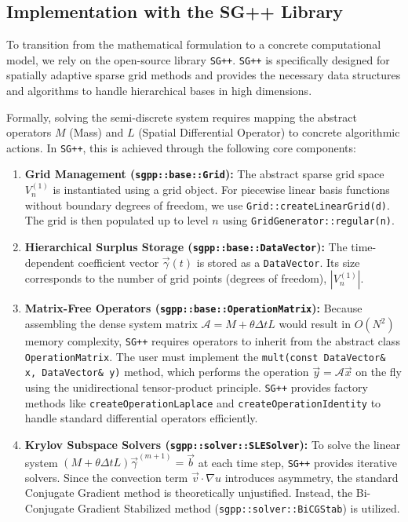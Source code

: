 \documentclass[12pt, a4paper]{article}
\begin{document}
\subsection{Implementation with the SG++ Library}

To transition from the mathematical formulation to a concrete computational model, we rely on the open-source library \texttt{SG++}. \texttt{SG++} is specifically designed for spatially adaptive sparse grid methods and provides the necessary data structures and algorithms to handle hierarchical bases in high dimensions.

Formally, solving the semi-discrete system requires mapping the abstract operators $M$ (Mass) and $L$ (Spatial Differential Operator) to concrete algorithmic actions. In \texttt{SG++}, this is achieved through the following core components:

\begin{enumerate}
    \item \textbf{Grid Management (\texttt{sgpp::base::Grid}):} 
    The abstract sparse grid space $V_n^{(1)}$ is instantiated using a grid object. For piecewise linear basis functions without boundary degrees of freedom, we use \texttt{Grid::createLinearGrid(d)}. The grid is then populated up to level $n$ using \texttt{GridGenerator::regular(n)}.
    
    \item \textbf{Hierarchical Surplus Storage (\texttt{sgpp::base::DataVector}):} 
    The time-dependent coefficient vector $\vec{\gamma}(t)$ is stored as a \texttt{DataVector}. Its size corresponds to the number of grid points (degrees of freedom), $|V_n^{(1)}|$. 
    
    \item \textbf{Matrix-Free Operators (\texttt{sgpp::base::OperationMatrix}):} 
    Because assembling the dense system matrix $\mathcal{A} = M + \theta \Delta t L$ would result in $O(N^2)$ memory complexity, \texttt{SG++} requires operators to inherit from the abstract class \texttt{OperationMatrix}. The user must implement the \texttt{mult(const DataVector\& x, DataVector\& y)} method, which performs the operation $\vec{y} = \mathcal{A} \vec{x}$ on the fly using the unidirectional tensor-product principle. \texttt{SG++} provides factory methods like \texttt{createOperationLaplace} and \texttt{createOperationIdentity} to handle standard differential operators efficiently.

    \item \textbf{Krylov Subspace Solvers (\texttt{sgpp::solver::SLESolver}):} 
    To solve the linear system $(M + \theta \Delta t L) \vec{\gamma}^{(m+1)} = \vec{b}$ at each time step, \texttt{SG++} provides iterative solvers. Since the convection term $\vec{v} \cdot \nabla u$ introduces asymmetry, the standard Conjugate Gradient method is theoretically unjustified. Instead, the Bi-Conjugate Gradient Stabilized method (\texttt{sgpp::solver::BiCGStab}) is utilized.
\end{enumerate}
\end{document}
